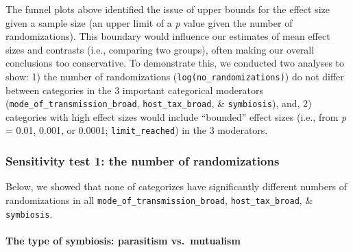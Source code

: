 \documentclass[
]{article}
\newenvironment{Shaded}{\begin{snugshade}}{\end{snugshade}}
\newcommand{\CommentTok}[1]{\textcolor[rgb]{0.56,0.35,0.01}{\textit{#1}}}
\newcommand{\DataTypeTok}[1]{\textcolor[rgb]{0.13,0.29,0.53}{#1}}
\newcommand{\DecValTok}[1]{\textcolor[rgb]{0.00,0.00,0.81}{#1}}
\newcommand{\KeywordTok}[1]{\textcolor[rgb]{0.13,0.29,0.53}{\textbf{#1}}}
\newcommand{\NormalTok}[1]{#1}
\newcommand{\OperatorTok}[1]{\textcolor[rgb]{0.81,0.36,0.00}{\textbf{#1}}}
\newcommand{\StringTok}[1]{\textcolor[rgb]{0.31,0.60,0.02}{#1}}
\begin{document}
The funnel plots above identified the issue of upper bounds for the
effect size given a sample size (an upper limit of a \emph{p} value
given the number of randomizations). This boundary would influence our
estimates of mean effect sizes and contrasts (i.e., comparing two
groups), often making our overall conclusions too conservative. To
demonstrate this, we conducted two analyses to show: 1) the number of
randomizations (\texttt{log(no\_randomizations)}) do not differ between
categories in the 3 important categorical moderators
(\texttt{mode\_of\_transmission\_broad}, \texttt{host\_tax\_broad}, \&
\texttt{symbiosis}), and, 2) categories with high effect sizes would
include ``bounded'' effect sizes (i.e., from \emph{p} = 0.01, 0.001, or
0.0001; \texttt{limit\_reached}) in the 3 moderators.

\hypertarget{sensitivity-test-1-the-number-of-randomizations}{%
\subsubsection{Sensitivity test 1: the number of
randomizations}\label{sensitivity-test-1-the-number-of-randomizations}}

Below, we showed that none of categorizes have significantly different
numbers of randomizations in all \texttt{mode\_of\_transmission\_broad},
\texttt{host\_tax\_broad}, \& \texttt{symbiosis}.

\hypertarget{the-type-of-symbiosis-parasitism-vs.-mutualism-1}{%
\paragraph{The type of symbiosis: parasitism
vs.~mutualism}\label{the-type-of-symbiosis-parasitism-vs.-mutualism-1}}

\begin{Shaded}
\end{Shaded}
\end{document}
